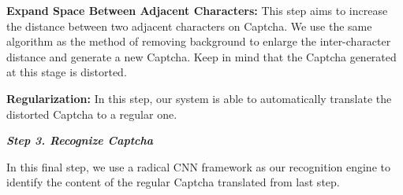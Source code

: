 \noindent \circling{\textcolor{white}{2}} \textbf{Expand Space Between Adjacent Characters:} This step aims to increase the distance between two adjacent characters on Captcha. We use the same algorithm as the method of removing background to enlarge the inter-character distance and generate a new Captcha. Keep in mind that the Captcha generated at this stage is distorted.

\noindent \circling{\textcolor{white}{3}} \textbf{Regularization:} In this step, our system is able to automatically translate the distorted Captcha to a regular one.

\noindent \textbf{\emph{Step 3. Recognize Captcha}}

In this final step, we use a radical CNN framework as our recognition engine to identify the content of the regular Captcha translated from last step.



